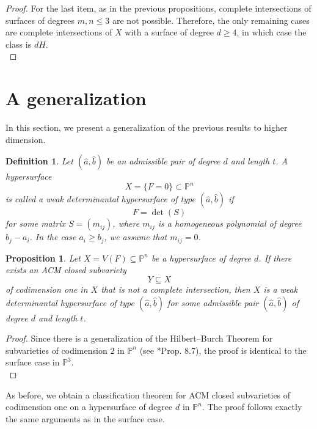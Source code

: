 \documentclass[12pt,reqno]{amsart}
\theoremstyle{plain}
\newtheorem{prop}[theorem]{Proposition}
\newtheorem{defi}[theorem]{Definition}
\theoremstyle{definition}
\theoremstyle{remark}
\theoremstyle{definition}
\newcommand{\PP}{\mathds{P}}
\newcommand{\PPP}{\PP^{3}}
\begin{document}
\begin{proof}
For the last item, as in the previous propositions, complete intersections of surfaces of degrees $m,n \leq 3$ are not possible. Therefore, the only remaining cases are complete intersections of $X$ with a surface of degree $d \geq 4$, in which case the class is $dH$.\\
\end{proof}


\section{A generalization} \label{sec::4}
In this section, we present a generalization of the previous results to higher dimension.

\begin{defi}
Let $(\hat{a},\hat{b})$ be an admissible pair of degree $d$ and length $t$. A hypersurface
\[
X=\{F=0\}\subset \PP^{n}
\]
is called a \textit{weak determinantal hypersurface} of type $(\hat{a},\hat{b})$ if
\[
F=\det(S)
\]
for some matrix $S=(m_{ij})$, where $m_{ij}$ is a homogeneous polynomial of degree $b_{j}-a_{i}$. In the case $a_{i}\geq b_{j}$, we assume that $m_{ij}=0$.
\end{defi}

\begin{prop}
Let $X=V(F)\subseteq \PP^{n}$ be a hypersurface of degree $d$. If there exists an ACM closed subvariety
\[
Y\subseteq X
\]
of codimension one in $X$ that is not a complete intersection, then $X$ is a weak determinantal hypersurface of type $(\hat{a},\hat{b})$ for some admissible pair $(\hat{a},\hat{b})$ of degree $d$ and length $t$.
\end{prop}

\begin{proof}
Since there is a generalization of the Hilbert--Burch Theorem for subvarieties of codimension $2$ in $\PP^{n}$ (see \cite{har3}*{Prop. 8.7}), the proof is identical to the surface case in $\PPP$.\\
\end{proof}

As before, we obtain a classification theorem for ACM closed subvarieties of codimension one on a hypersurface of degree $d$ in $\PP^{n}$. The proof follows exactly the same arguments as in the surface case.
\end{document}
